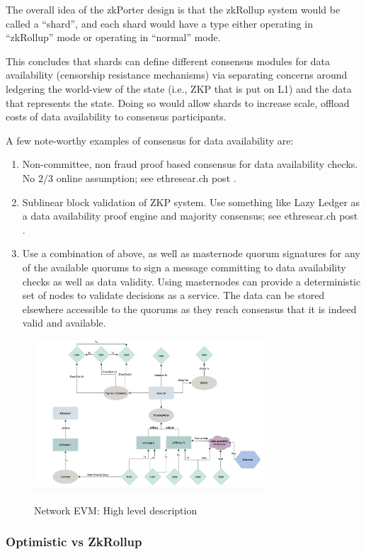 \documentclass[peerreview]{ieeesyscoin}
\begin{document}
The overall idea of the zkPorter design is that the zkRollup system would be called a “shard”, and each shard would have a type either operating in “zkRollup” mode or operating in “normal” mode. 

This concludes that shards can define different consensus modules for data availability (censorship resistance mechanisms) via separating concerns around ledgering the world-view of the state (i.e., ZKP that is put on L1) and the data that represents the state. Doing so would allow shards to increase scale, offload costs of data availability to consensus participants.

A few note-worthy examples of consensus for data availability are:

\begin{enumerate}
\item Non-committee, non fraud proof based consensus for data availability checks. No $2/3$ online assumption; see ethresear.ch post \cite{But20}. 
\item Sublinear block validation of ZKP system. Use something like Lazy Ledger as a data availability proof engine and majority consensus; see ethresear.ch post \cite{Al20}. 
\item Use a combination of above, as well as masternode quorum signatures for any of the available quorums to sign a message committing to data availability checks as well as data validity. Using masternodes can provide a deterministic set of nodes to validate decisions as a service. The data can be stored elsewhere accessible to the quorums as they reach consensus that it is indeed valid and available.
\end{enumerate}


\begin{figure}[h!]
\includegraphics[width=3.4in]{img/nevm.png}
\label{fig:nevm}
\caption{Network EVM: High level description} 
\end{figure} 

\subsubsection{Optimistic vs ZkRollup}
\end{document}
